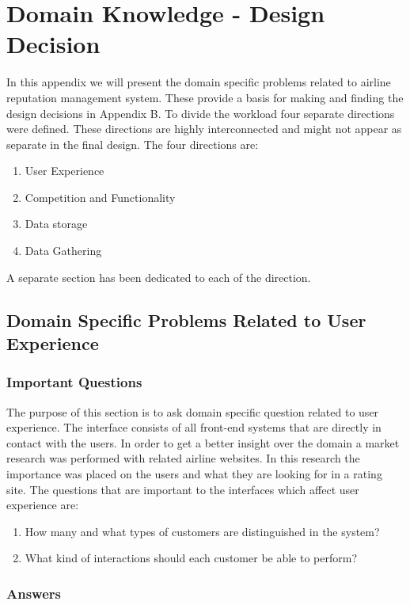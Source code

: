\section{Domain Knowledge - Design Decision}
In this appendix we will present the domain specific problems related to airline reputation management system. These provide a basis for making and finding the design decisions in Appendix B. 
To divide the workload four separate directions were defined. These directions are highly interconnected and might not appear as separate in the final design. The four directions are:
\begin{enumerate}
\item User Experience
\item Competition and Functionality
\item Data storage
\item Data Gathering
\end{enumerate}
A separate section has been dedicated to each of the direction. 

\subsection{Domain Specific Problems Related to User Experience}
\subsubsection{Important Questions}
The purpose of this section is to ask domain specific question related to user experience. The interface consists of all front-end systems that are directly in contact with the users. 
In order to get a better insight over the domain a market research was performed with related airline websites. In this research the importance was placed on the users and what they are looking for in a rating site. 
The questions that are important to the interfaces which affect user experience are:
\begin{enumerate}
\item How many and what types of customers are distinguished in the system?
\item What kind of interactions should each customer be able to perform?
\end{enumerate}

\subsubsection{Answers}

